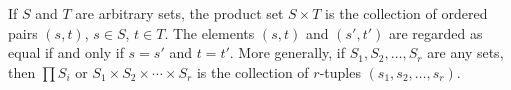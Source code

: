 If $S$ and $T$ are arbitrary sets, the product set $S \times T$ is the collection of ordered pairs $(s,t)$, $s \in S$, $t \in T$. The elements $(s,t)$ and $(s',t')$ are regarded as equal if and only if $s = s'$ and $t = t'$. More generally, if $S_1, S_2, \ldots, S_r$ are any sets, then $\prod S_i$ or $S_1 \times S_2 \times \cdots \times S_r$ is the collection of $r$-tuples $(s_1, s_2, \ldots, s_r)$.
